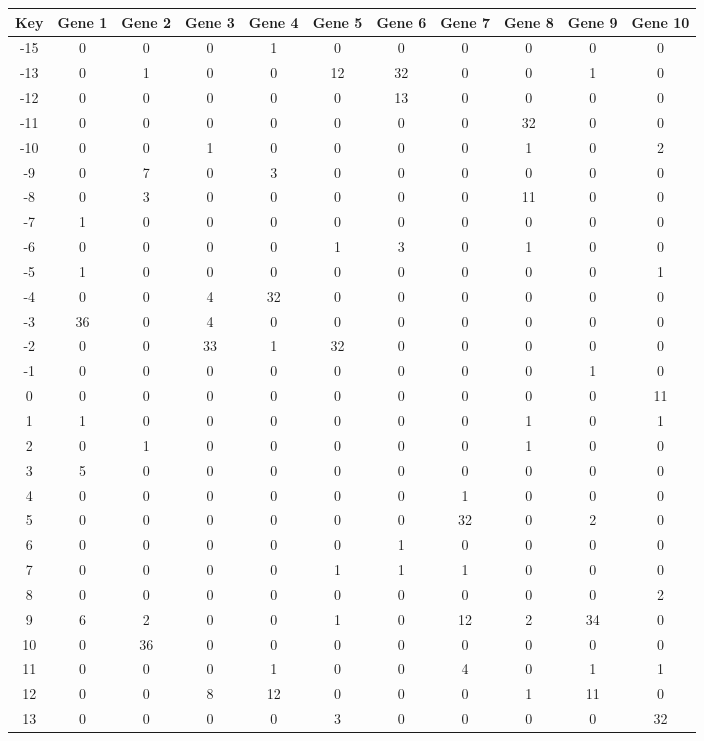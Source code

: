 \begin{tabular}{|c|c|c|c|c|c|c|c|c|c|c|}
\hline
Key & Gene 1 & Gene 2 & Gene 3 & Gene 4 & Gene 5 & Gene 6 & Gene 7 & Gene 8 & Gene 9 & Gene 10 \\
\hline
-15 & 0 & 0 & 0 & 1 & 0 & 0 & 0 & 0 & 0 & 0 \\
-13 & 0 & 1 & 0 & 0 & 12 & 32 & 0 & 0 & 1 & 0 \\
-12 & 0 & 0 & 0 & 0 & 0 & 13 & 0 & 0 & 0 & 0 \\
-11 & 0 & 0 & 0 & 0 & 0 & 0 & 0 & 32 & 0 & 0 \\
-10 & 0 & 0 & 1 & 0 & 0 & 0 & 0 & 1 & 0 & 2 \\
-9 & 0 & 7 & 0 & 3 & 0 & 0 & 0 & 0 & 0 & 0 \\
-8 & 0 & 3 & 0 & 0 & 0 & 0 & 0 & 11 & 0 & 0 \\
-7 & 1 & 0 & 0 & 0 & 0 & 0 & 0 & 0 & 0 & 0 \\
-6 & 0 & 0 & 0 & 0 & 1 & 3 & 0 & 1 & 0 & 0 \\
-5 & 1 & 0 & 0 & 0 & 0 & 0 & 0 & 0 & 0 & 1 \\
-4 & 0 & 0 & 4 & 32 & 0 & 0 & 0 & 0 & 0 & 0 \\
-3 & 36 & 0 & 4 & 0 & 0 & 0 & 0 & 0 & 0 & 0 \\
-2 & 0 & 0 & 33 & 1 & 32 & 0 & 0 & 0 & 0 & 0 \\
-1 & 0 & 0 & 0 & 0 & 0 & 0 & 0 & 0 & 1 & 0 \\
0 & 0 & 0 & 0 & 0 & 0 & 0 & 0 & 0 & 0 & 11 \\
1 & 1 & 0 & 0 & 0 & 0 & 0 & 0 & 1 & 0 & 1 \\
2 & 0 & 1 & 0 & 0 & 0 & 0 & 0 & 1 & 0 & 0 \\
3 & 5 & 0 & 0 & 0 & 0 & 0 & 0 & 0 & 0 & 0 \\
4 & 0 & 0 & 0 & 0 & 0 & 0 & 1 & 0 & 0 & 0 \\
5 & 0 & 0 & 0 & 0 & 0 & 0 & 32 & 0 & 2 & 0 \\
6 & 0 & 0 & 0 & 0 & 0 & 1 & 0 & 0 & 0 & 0 \\
7 & 0 & 0 & 0 & 0 & 1 & 1 & 1 & 0 & 0 & 0 \\
8 & 0 & 0 & 0 & 0 & 0 & 0 & 0 & 0 & 0 & 2 \\
9 & 6 & 2 & 0 & 0 & 1 & 0 & 12 & 2 & 34 & 0 \\
10 & 0 & 36 & 0 & 0 & 0 & 0 & 0 & 0 & 0 & 0 \\
11 & 0 & 0 & 0 & 1 & 0 & 0 & 4 & 0 & 1 & 1 \\
12 & 0 & 0 & 8 & 12 & 0 & 0 & 0 & 1 & 11 & 0 \\
13 & 0 & 0 & 0 & 0 & 3 & 0 & 0 & 0 & 0 & 32 \\
\hline
\end{tabular}
